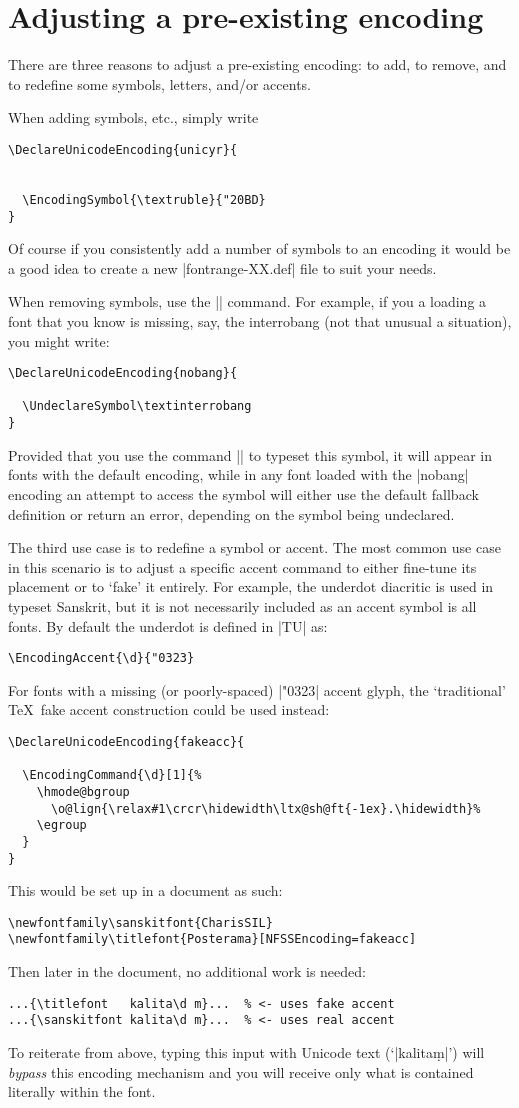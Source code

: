 \documentclass[a4paper]{l3doc}
\begin{document}
\section{Adjusting a pre-existing encoding}

There are three reasons to adjust a pre-existing encoding:
to add, to remove, and to redefine some symbols, letters, and/or accents.

When adding symbols, etc., simply write
\begin{Verbatim}
\DeclareUnicodeEncoding{unicyr}{
  
  
  \EncodingSymbol{\textruble}{"20BD}
}
\end{Verbatim}
Of course if you consistently add a number of symbols to an encoding it would be
a good idea to create a new |fontrange-XX.def| file to suit your needs.

When removing symbols, use the |\UndeclareSymbol| command.
For example, if you a loading a font that you know is missing, say, the interrobang
(not that unusual a situation), you might write:
\begin{Verbatim}
\DeclareUnicodeEncoding{nobang}{
  
  \UndeclareSymbol\textinterrobang
}
\end{Verbatim}
Provided that you use the command |\textinterrobang| to typeset this symbol,
it will appear in fonts with the default encoding, while in any font loaded with
the |nobang| encoding an attempt to access the symbol will either use the default
fallback definition or return an error, depending on the symbol being undeclared.


The third use case is to redefine a symbol or accent. The most common use case
in this scenario is to adjust a specific accent command to either fine-tune its placement
or to `fake' it entirely.
For example, the underdot diacritic is used in typeset Sanskrit,
but it is not necessarily included as an accent symbol is all fonts.
By default the underdot is defined in |TU| as:
\begin{Verbatim}
\EncodingAccent{\d}{"0323}
\end{Verbatim}
For fonts with a missing (or poorly-spaced) |"0323| accent glyph, the `traditional' \TeX\ fake accent
construction could be used instead:
\begin{Verbatim}
\DeclareUnicodeEncoding{fakeacc}{
  
  \EncodingCommand{\d}[1]{%
    \hmode@bgroup
      \o@lign{\relax#1\crcr\hidewidth\ltx@sh@ft{-1ex}.\hidewidth}%
    \egroup
  }
}
\end{Verbatim}
This would be set up in a document as such:
\begin{Verbatim}
\newfontfamily\sanskitfont{CharisSIL}
\newfontfamily\titlefont{Posterama}[NFSSEncoding=fakeacc]
\end{Verbatim}
Then later in the document, no additional work is needed:
\begin{Verbatim}
...{\titlefont   kalita\d m}...  % <- uses fake accent
...{\sanskitfont kalita\d m}...  % <- uses real accent
\end{Verbatim}
To reiterate from above, typing this input with Unicode text (`|kalitaṃ|')
will \emph{bypass} this encoding mechanism and you will receive only what is contained
literally within the font.
\end{document}
